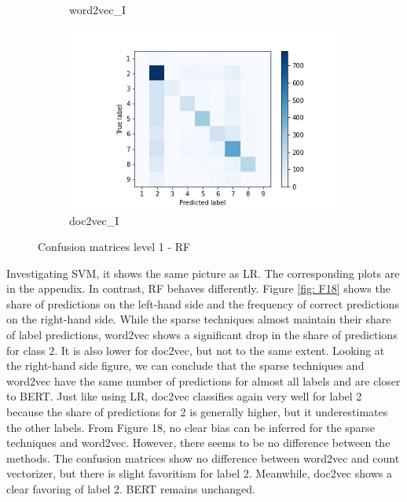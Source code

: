 \documentclass[12pt, a4paper, titlepage]{article}
\begin{document}
\begin{figure}[hb!]
\begin{subfigure}[b]{0.475\textwidth}
    {{\small word2vec\_I}}    
  \end{subfigure}
  \hfill
  \begin{subfigure}[b]{0.475\textwidth}   
      \centering 
      \includegraphics[width=\textwidth]{cm_doc2vec_without_RF.jpg}
      {{\small doc2vec\_I}}    
  \end{subfigure}
  \caption{\label{fig: F20} Confusion matrices level 1 - RF}
\end{figure}

Investigating \ac{SVM}, it shows the same picture as \ac{LR}. The corresponding plots are in the appendix. In contrast, \ac{RF} behaves differently. Figure \ref{fig: F18} shows the share of predictions on the left-hand side and the frequency of correct predictions on the right-hand side. While the sparse techniques almost maintain their share of label predictions, word2vec shows a significant drop in the share of predictions for class 2. It is also lower for doc2vec, but not to the same extent. Looking at the right-hand side figure, we can conclude that the sparse techniques and word2vec have the same number of predictions for almost all labels and are closer to \ac{BERT}. Just like using \ac{LR}, doc2vec classifies again very well for label 2 because the share of predictions for 2 is generally higher, but it underestimates the other labels. From Figure 18, no clear bias can be inferred for the sparse techniques and word2vec. However, there seems to be no difference between the methods. The confusion matrices show no difference between word2vec and count vectorizer, but there is slight favoritism for label 2. Meanwhile, doc2vec shows a clear favoring of label 2. \ac{BERT} remains unchanged.
\end{document}
